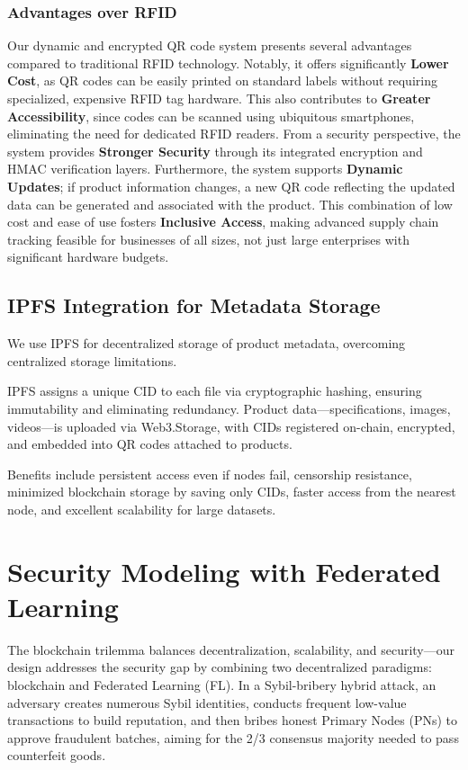 \documentclass[conference]{IEEEtran}
\begin{document}
\subsubsection{\bfseries Advantages over RFID}

Our dynamic and encrypted QR code system presents several advantages compared to traditional RFID technology. Notably, it offers significantly \textbf{Lower Cost}, as QR codes can be easily printed on standard labels without requiring specialized, expensive RFID tag hardware. This also contributes to \textbf{Greater Accessibility}, since codes can be scanned using ubiquitous smartphones, eliminating the need for dedicated RFID readers. From a security perspective, the system provides \textbf{Stronger Security} through its integrated encryption and HMAC verification layers. Furthermore, the system supports \textbf{Dynamic Updates}; if product information changes, a new QR code reflecting the updated data can be generated and associated with the product. This combination of low cost and ease of use fosters \textbf{Inclusive Access}, making advanced supply chain tracking feasible for businesses of all sizes, not just large enterprises with significant hardware budgets.

\subsection{IPFS Integration for Metadata Storage}

We use IPFS for decentralized storage of product metadata, overcoming centralized storage limitations.

IPFS assigns a unique CID to each file via cryptographic hashing, ensuring immutability and eliminating redundancy. Product data—specifications, images, videos—is uploaded via Web3.Storage, with CIDs registered on-chain, encrypted, and embedded into QR codes attached to products.

Benefits include persistent access even if nodes fail, censorship resistance, minimized blockchain storage by saving only CIDs, faster access from the nearest node, and excellent scalability for large datasets.

\section{Security Modeling with Federated Learning}

The blockchain trilemma balances decentralization, scalability, and security—our design addresses the security gap by combining two decentralized paradigms: blockchain and Federated Learning (FL). In a Sybil-bribery hybrid attack, an adversary creates numerous Sybil identities, conducts frequent low-value transactions to build reputation, and then bribes honest Primary Nodes (PNs) to approve fraudulent batches, aiming for the 2/3 consensus majority needed to pass counterfeit goods.
\end{document}
